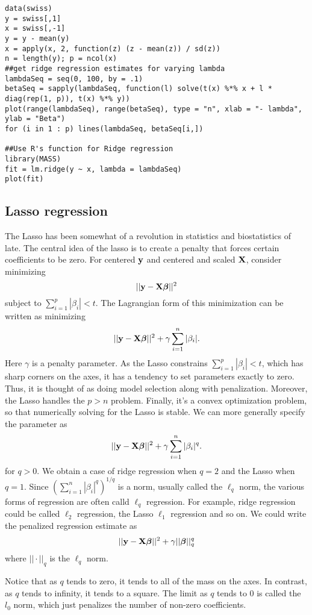 \begin{verbatim}
data(swiss)
y = swiss[,1]
x = swiss[,-1]
y = y - mean(y)
x = apply(x, 2, function(z) (z - mean(z)) / sd(z))
n = length(y); p = ncol(x)
##get ridge regression estimates for varying lambda
lambdaSeq = seq(0, 100, by = .1)
betaSeq = sapply(lambdaSeq, function(l) solve(t(x) %*% x + l * diag(rep(1, p)), t(x) %*% y))
plot(range(lambdaSeq), range(betaSeq), type = "n", xlab = "- lambda", ylab = "Beta")
for (i in 1 : p) lines(lambdaSeq, betaSeq[i,])

##Use R's function for Ridge regression
library(MASS)
fit = lm.ridge(y ~ x, lambda = lambdaSeq)
plot(fit)

\end{verbatim}


\subsection{Lasso regression}

The Lasso has been somewhat of a revolution in statistics and biostatistics
of late. The central idea of the lasso is to create a penalty that forces
certain coefficients to be zero. For centered $\mathbf{y}$ and centered and scaled $\mathbf{X}$, 
consider minimizing
$$
|| \mathbf{y} - \mathbf{X} \boldsymbol{\beta}||^2
$$
subject to $\sum_{i=1}^p | \beta_i| < t$. The Lagrangian form of this minimization
can be written as minimizing
$$
|| \mathbf{y} - \mathbf{X} \boldsymbol{\beta}||^2 + \gamma \sum_{i=1}^n | \beta_i|.
$$
Here $\gamma$ is a penalty parameter. As the Lasso constrains
$\sum_{i=1}^p | \beta_i| < t$, which has sharp corners on the axes,
it has a tendency to set parameters exactly to zero. Thus, it is 
thought of as doing model selection along with penalization. 
Moreover, the Lasso handles the $p > n$ problem. Finally, it's
a convex optimization problem, so that numerically solving 
for the Lasso is stable. We can more generally specify the parameter
as
$$
|| \mathbf{y} - \mathbf{X} \boldsymbol{\beta}||^2 + \gamma \sum_{i=1}^n | \beta_i |^q.
$$
for $q > 0$. We obtain a case of ridge regression when $q=2$ and
the Lasso when $q=1$. Since $(\sum_{i=1}^n | \beta_i |^q)^{1/q}$ is a norm,
usually called the $\ell_q$ norm, the various forms of
regression are often calld $\ell_q$ regression. For example,
ridge regression could be called $\ell_2$ regression, the Lasso
$\ell_1$ regression and so on. We could write the penalized regression estimate as
$$
|| \mathbf{y} - \mathbf{X} \boldsymbol{\beta}||^2 + \gamma ||\boldsymbol{\beta}||_q^q
$$
where $||\cdot||_q$ is the $\ell_q$ norm.


Notice that as $q$ tends to zero, it tends to all of the mass on the axes. In contrast, as $q$ tends to infinity, it tends
to a square. The limit as $q$ tends to 0 is called the $l_0$ norm, which just penalizes the number
of non-zero coefficients. 

